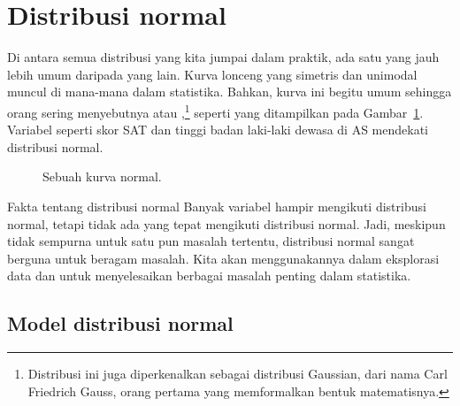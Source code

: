 \section{Distribusi normal}
\label{normalDist}


Di antara semua distribusi yang kita jumpai dalam praktik,
ada satu yang jauh lebih umum daripada yang lain.
Kurva lonceng yang simetris dan unimodal muncul di mana-mana
dalam statistika.
Bahkan, kurva ini begitu umum sehingga orang sering menyebutnya
 atau
%
,\footnote{Distribusi ini juga diperkenalkan sebagai distribusi Gaussian,
  dari nama Carl Friedrich Gauss, orang pertama yang memformalkan
  bentuk matematisnya.}
seperti yang ditampilkan pada Gambar~\ref{simpleNormal}.
Variabel seperti skor SAT dan tinggi badan laki-laki dewasa di AS
mendekati distribusi normal.

\begin{figure}[h]
  \centering
  \caption{Sebuah kurva normal.}
  \label{simpleNormal}
\end{figure}

\begin{onebox}{Fakta tentang distribusi normal}
  Banyak variabel hampir mengikuti distribusi normal, tetapi tidak ada
  yang tepat mengikuti distribusi normal.
  Jadi, meskipun tidak sempurna untuk satu pun masalah tertentu,
  distribusi normal sangat berguna untuk beragam masalah.
  Kita akan menggunakannya dalam eksplorasi data dan untuk menyelesaikan
  berbagai masalah penting dalam statistika.
\end{onebox}


\subsection{Model distribusi normal}

